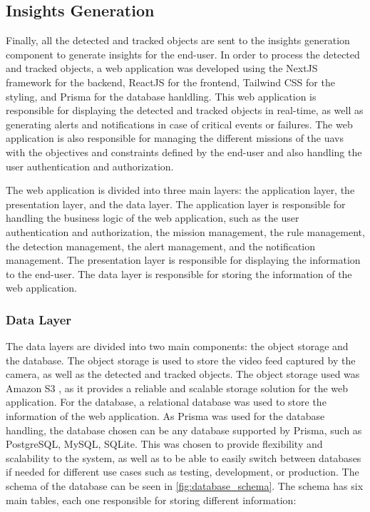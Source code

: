
\subsection{Insights Generation}\label{subsec:implementation_insights_generation}

Finally, all the detected and tracked objects are sent to the insights generation component to generate insights for the end-user. In order to process the detected and tracked objects, a web application was developed using the NextJS framework \autocite{nextjsNextjsVercel} for the backend, ReactJS \autocite{reactReact} for the frontend, Tailwind CSS \autocite{tailwindcssTailwindRapidly} for the styling, and Prisma \autocite{prismaPrismaSimplify} for the database hanldling. This web application is responsible for displaying the detected and tracked objects in real-time, as well as generating alerts and notifications in case of critical events or failures. The web application is also responsible for managing the different missions of the \glspl{uav} with the objectives and constraints defined by the end-user and also handling the user authentication and authorization.

The web application is divided into three main layers: the application layer, the presentation layer, and the data layer. The application layer is responsible for handling the business logic of the web application, such as the user authentication and authorization, the mission management, the rule management, the detection management, the alert management, and the notification management. The presentation layer is responsible for displaying the information to the end-user. The data layer is responsible for storing the information of the web application.

\subsubsection{Data Layer}\label{subsubsec:implementation_data_layer}
The data layers are divided into two main components: the object storage and the database. The object storage is used to store the video feed captured by the camera, as well as the detected and tracked objects. The object storage used was Amazon S3 \autocite{amazonCloudComputing}, as it provides a reliable and scalable storage solution for the web application.  For the database, a relational database was used to store the information of the web application. As Prisma \autocite{prismaPrismaSimplify} was used for the database handling, the database chosen can be any database supported by Prisma, such as PostgreSQL, MySQL, SQLite. This was chosen to provide flexibility and scalability to the system, as well as to be able to easily switch between databases if needed for different use cases such as testing, development, or production. The schema of the database can be seen in \cref{fig:database_schema}. The schema has six main tables, each one responsible for storing different information:

